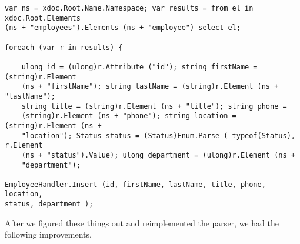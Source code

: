     \begin{lstlisting}
var ns = xdoc.Root.Name.Namespace; var results = from el in xdoc.Root.Elements
(ns + "employees").Elements (ns + "employee") select el;

foreach (var r in results) {

    ulong id = (ulong)r.Attribute ("id"); string firstName = (string)r.Element
    (ns + "firstName"); string lastName = (string)r.Element (ns + "lastName");
    string title = (string)r.Element (ns + "title"); string phone =
    (string)r.Element (ns + "phone"); string location = (string)r.Element (ns +
    "location"); Status status = (Status)Enum.Parse ( typeof(Status), r.Element
    (ns + "status").Value); ulong department = (ulong)r.Element (ns +
    "department");

EmployeeHandler.Insert (id, firstName, lastName, title, phone, location,
status, department );
    \end{lstlisting}
    After we figured these things out and reimplemented the parser, we had the
    following improvements.








